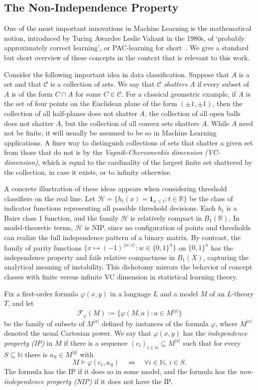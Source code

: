 \documentclass[psamsfonts]{amsart}
\theoremstyle{definition}
\theoremstyle{remark}
\numberwithin{equation}{section}
\begin{document}
\subsection{The Non-Independence Property}

One of the most important innovations in Machine Learning is the mathematical notion, introduced by Turing Awardee Leslie Valiant in the 1980s, of ‘probably approximately correct learning’, or PAC-learning for short~\cite{bendavid2019understanding}. We give a standard but short overview of these concepts in the context that is relevant to this work.

Consider the following important idea in data classification. Suppose that $A$ is a set and that $\mathcal C$ is a collection of sets. We say that $\mathcal C$ \emph{shatters} $A$ if every subset of $A$ is of the form $C\cap A$ for some $C\in\mathcal C$. For a classical geometric example, if $A$ is the set of four points on the Euclidean plane of the form $(\pm1,\pm1)$, then the collection of all half-planes does not shatter $A$, the collection of all open balls does not shatter $A$, but the collection of all convex sets shatters $A$. While $A$ need not be finite, it will usually be assumed to be so in Machine Learning applications. A finer way to distinguish collections of sets that shatter a given set from those that do not is by the \emph{Vapnik-Chervonenkis dimension (VC-dimension)}, which is equal to the cardinality of the largest finite set shattered by the collection, in case it exists, or to infinity otherwise.

A concrete illustration of these ideas appears when considering threshold classifiers on the real line. Let $\mathcal{H}=\{h_t(x)=\mathbf{1}_{x\le t}:t\in\mathbb{R}\}$ be the class of indicator functions representing all possible threshold decisions. Each $h_t$ is a Baire class 1 function, and the family $\mathcal{H}$ is relatively compact in $B_1(\mathbb{R})$. In model-theoretic terms, $\mathcal{H}$ is NIP, since no configuration of points and thresholds can realize the full independence pattern of a binary matrix. By contrast, the family of parity functions $\{x\mapsto (-1)^{\langle w,x\rangle}:w\in\{0,1\}^n\}$ on $\{0,1\}^n$ has the independence property and fails relative compactness in $B_1(X)$, capturing the analytical meaning of instability. This dichotomy mirrors the behavior of concept classes with finite versus infinite VC dimension in statistical learning theory.

Fix a first-order formula $\varphi(x,y)$ in a language $L$ and a model $M$ of an $L$-theory $T$, and let $$\mathcal F_\varphi(M):=\{\varphi(M,a):a\in M^{|y|}\}$$ be the family of subsets of $M^{|x|}$ defined by instances of the formula $\varphi$, where $M^{|x|}$ denoted the usual Cartesian power. We say that $\varphi(x,y)$ has the \emph{independence property (IP)} in $M$ if there is a sequence $(c_i)_{i\in\mathbb N}\subseteq M^{|x|}$ such that for every $S\subseteq\mathbb N$ there is $a_S\in M^{|y|}$ with $$M\models\varphi(c_i,a_S)\quad\iff\quad \forall i\in\mathbb N,\ i\in S.$$ The formula has the IP if it does so in some model, and the formula has the \emph{non-independence property (NIP)} if it does not have the IP.
\end{document}
